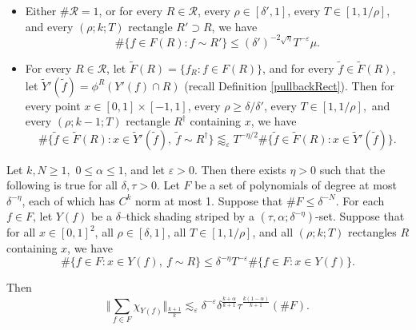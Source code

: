 \documentclass[10pt,a4paper]{amsart}
\newcommand{\eps}{\varepsilon}
\begin{document}
\begin{prop}
\begin{itemize}
%
\item[(B)]
Either $\#\mathcal{R}=1$, or for every $R\in\mathcal{R}$, every $\rho\in[\delta',1]$, every $T\in [1,1/\rho]$, and every $(\rho; k; T)$ rectangle $R'\supset R$, we have
\begin{equation}\label{conclusionB}
\#\{f\in F(R)\colon f\sim R'\} \leq (\delta')^{-2\sqrt\eta}T^{-\eps} \mu.
\end{equation}
%
\item[(C)]
For every $R\in\mathcal{R}$, let $\tilde F(R)=\{f_R\colon f\in F(R)\}$, and for every $\tilde f\in \tilde F(R)$, let $\tilde Y'(\tilde f)=\phi^R(Y'(f)\cap R)$ (recall Definition \ref{pullbackRect}). Then for every point $x\in[0,1]\times[-1,1]$, every $\rho\geq\delta/\delta'$, every $T\in[1,1/\rho],$ and every $(\rho; k-1; T)$ rectangle $R^\dag$ containing $x$, we have
\begin{equation}\label{inductionPropHypothesisAfterIteration}
\#\{\tilde f\in \tilde F(R)\colon x\in \tilde Y'(\tilde f),\  \tilde f\sim R^\dag\}\lessapprox_\eps  T^{-\eta/2} \#\{\tilde f\in \tilde F(R)\colon x\in \tilde Y'(\tilde f)\}. 
\end{equation}
\end{itemize}
\end{prop}

\begin{prop}\label{maximalFnBdNonconcentrated}
Let $k,N\geq 1,$ $0\leq \alpha\leq 1$, and let $\eps>0$. Then there exists $\eta>0$ such that the following is true for all $\delta,\tau>0$. Let $F$ be a set of polynomials of degree at most $\delta^{-\eta}$, each of which has $C^{k}$ norm at most 1. Suppose that $\#F\leq\delta^{-N}$. For each $f\in F$, let $Y(f)$ be a $\delta$--thick shading striped by a $(\tau,\alpha;\delta^{-\eta})$-set. Suppose that for all $x\in [0,1]^2$, all $\rho\in[\delta,1]$, all $T\in [1, 1/\rho]$, and all $(\rho; k; T)$ rectangles $R$ containing $x$, we have
%
\begin{equation}\label{rectangleConcentrationBdNonconcentratedProp}
\#\{f\in F\colon x\in Y(f),\ f\sim R\} \leq \delta^{-\eta}T^{-\eps}\#\{f\in F\colon x\in Y(f)\}.
\end{equation}
%

Then
\begin{equation}\label{NonconcentratedPropLpBound}
\Big \Vert \sum_{f\in F}\chi_{Y(f)}\Big\Vert_{\frac{k+1}{k}}\lesssim_\eps  \delta^{-\eps}\delta^{\frac{k+\alpha}{k+1}}\tau^{\frac{k(1-\alpha)}{k+1}}
(\#F).
\end{equation}
\end{prop}
\end{document}
